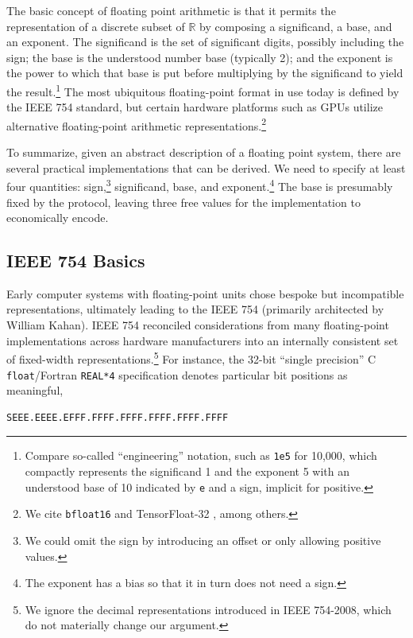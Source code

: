 \documentclass[twoside]{article}
\begin{document}
The basic concept of floating point arithmetic is that it permits the representation of a discrete subset of $\mathbb{R}$ by composing a significand, a base, and an exponent.  The significand is the set of significant digits, possibly including the sign; the base is the understood number base (typically 2); and the exponent is the power to which that base is put before multiplying by the significand to yield the result.\footnote{Compare so-called “engineering” notation, such as \texttt{1e5} for 10,000, which compactly represents the significand 1 and the exponent 5 with an understood base of 10 indicated by \texttt{e} and a sign, implicit for positive.}  The most ubiquitous floating-point format in use today is defined by the IEEE 754 standard, but certain hardware platforms such as GPUs utilize alternative floating-point arithmetic representations.\footnote{We cite \texttt{bfloat16} \citep{Wang2019} and TensorFloat-32 \citep{Kharva2020}, among others.}

To summarize, given an abstract description of a floating point system, there are several practical implementations that can be derived.  We need to specify at least four quantities:  sign,\footnote{We could omit the sign by introducing an offset or only allowing positive values.} significand, base, and exponent.\footnote{The exponent has a bias so that it in turn does not need a sign.}  The base is presumably fixed by the protocol, leaving three free values for the implementation to economically encode.


\subsection{IEEE 754 Basics}

Early computer systems with floating-point units chose bespoke but incompatible representations, ultimately leading to the IEEE 754 (primarily architected by William Kahan).  IEEE 754 reconciled considerations from many floating-point implementations across hardware manufacturers into an internally consistent set of fixed-width representations.\footnote{We ignore the decimal representations introduced in IEEE 754-2008, which do not materially change our argument.}  For instance, the 32-bit “single precision” C \texttt{float}/Fortran \texttt{REAL*4} specification denotes particular bit positions as meaningful,

\begin{lstlisting}
SEEE.EEEE.EFFF.FFFF.FFFF.FFFF.FFFF.FFFF
\end{lstlisting}
\end{document}

